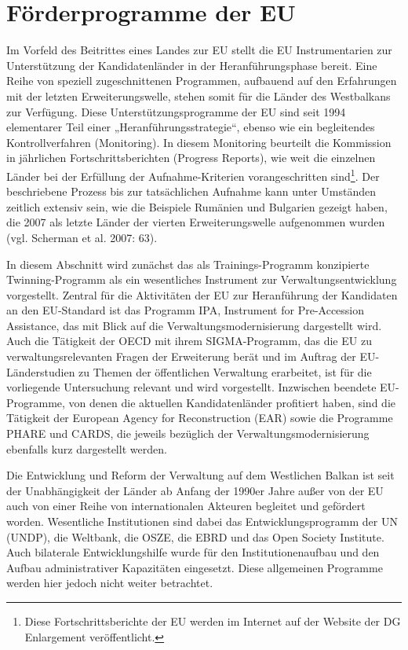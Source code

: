 \section{Förderprogramme der EU}
Im Vorfeld des Beitrittes eines Landes zur EU stellt die EU Instrumentarien zur Unterstützung der Kandidatenländer in der Heranführungsphase bereit. Eine Reihe von speziell zugeschnittenen Programmen, aufbauend auf den Erfahrungen mit der letzten Erweiterungswelle, stehen somit für die Länder des Westbalkans zur Verfügung. Diese Unterstützungsprogramme der EU sind seit 1994 elementarer Teil einer „Heranführungsstrategie“, ebenso wie ein begleitendes Kontrollverfahren (Monitoring). In diesem Monitoring beurteilt die Kommission in jährlichen Fortschrittsberichten (Progress Reports), wie weit die einzelnen Länder bei der Erfüllung der Aufnahme-Kriterien vorangeschritten sind\footnote{Diese Fortschrittsberichte der EU werden im Internet auf der Website der DG Enlargement veröffentlicht.}. Der beschriebene Prozess bis zur tatsächlichen Aufnahme kann unter Umständen zeitlich extensiv sein, wie die Beispiele Rumänien und Bulgarien gezeigt haben, die 2007 als letzte Länder der vierten Erweiterungswelle aufgenommen wurden (vgl. Scherman et al. 2007: 63). 
\par
In diesem Abschnitt wird zunächst das als Trainings-Programm konzipierte Twinning-Programm als ein wesentliches Instrument zur Verwaltungsentwicklung vorgestellt. Zentral für die Aktivitäten der EU zur Heranführung der Kandidaten an den EU-Standard ist das Programm IPA, Instrument for Pre-Accession Assistance, das mit Blick auf die Verwaltungsmodernisierung dargestellt wird. Auch die Tätigkeit der OECD mit ihrem SIGMA-Programm, das die EU zu verwaltungsrelevanten Fragen der Erweiterung berät und im Auftrag der EU-Länderstudien zu Themen der öffentlichen Verwaltung erarbeitet, ist für die vorliegende Untersuchung relevant und wird vorgestellt. Inzwischen beendete EU-Programme, von denen die aktuellen Kandidatenländer profitiert haben, sind die Tätigkeit der European Agency for Reconstruction (EAR) sowie die Programme PHARE und CARDS, die jeweils bezüglich der Verwaltungsmodernisierung ebenfalls kurz dargestellt werden. \par
Die Entwicklung und Reform der Verwaltung auf dem Westlichen Balkan ist seit der Unabhängigkeit der Länder ab Anfang der 1990er Jahre außer von der EU auch von einer Reihe von internationalen Akteuren begleitet und gefördert worden. Wesentliche Institutionen sind dabei das Entwicklungsprogramm der UN (UNDP), die Weltbank, die OSZE, die EBRD und das Open Society Institute. Auch bilaterale Entwicklungshilfe wurde für den Institutionenaufbau und den Aufbau administrativer Kapazitäten eingesetzt. Diese allgemeinen Programme werden hier jedoch nicht weiter betrachtet.
